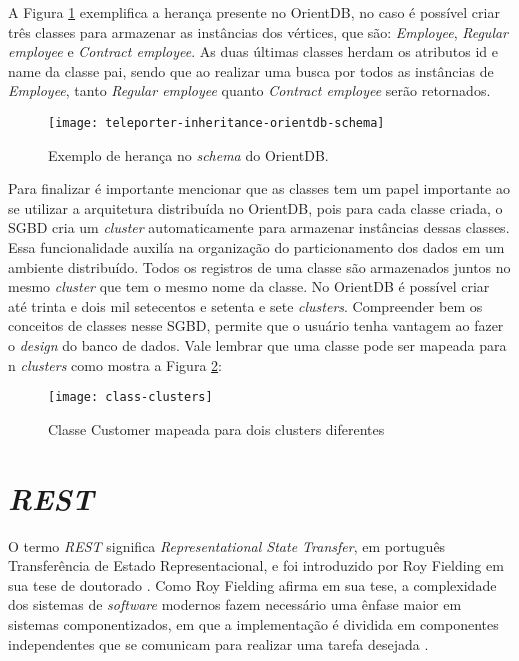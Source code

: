 	A Figura \ref{fig:inheritance-orient}  exemplifica a herança presente no OrientDB, no caso é possível criar três classes para armazenar as instâncias dos vértices, que são: \textit{Employee}, \textit{Regular employee} e \textit{Contract employee}. As duas últimas classes herdam os atributos id e name da classe pai, sendo que ao realizar uma busca por todos as instâncias de \textit{Employee}, tanto \textit{Regular employee} quanto \textit{Contract employee} serão retornados.
	
\begin{figure}[h]
	\centering
    \texttt{[image: teleporter-inheritance-orientdb-schema]}
    \caption{Exemplo de herança no \textit{schema} do OrientDB. }
    \label{fig:inheritance-orient}
\end{figure}
	
	Para finalizar é importante mencionar que as classes tem um papel importante ao se utilizar a arquitetura distribuída no OrientDB, pois para cada classe criada, o SGBD cria um \textit{cluster} automaticamente para armazenar instâncias dessas classes. Essa funcionalidade auxilía na organização do particionamento dos dados em um ambiente distribuído. Todos os registros de uma classe são armazenados juntos no mesmo \textit{cluster} que tem o mesmo nome da classe. No OrientDB é possível criar até trinta e dois mil setecentos e setenta e sete \textit{clusters}. Compreender bem os conceitos de classes nesse SGBD, permite que o usuário tenha vantagem ao fazer o \textit{design} do banco de dados. Vale lembrar que uma classe pode ser mapeada para n \textit{clusters} como mostra a Figura \ref{fig:class-cluster}:
\begin{figure}[h]
	\centering
    \texttt{[image: class-clusters]}
    \caption{Classe Customer mapeada para dois clusters diferentes}
    \label{fig:class-cluster}
\end{figure}

\section{\textit{REST}}

	O termo \textit{REST} significa \textit{Representational State Transfer}, em português Transferência de Estado Representacional, e foi introduzido por Roy Fielding em sua tese de doutorado \cite{fielding2000architectural}. Como Roy Fielding afirma em sua tese, a complexidade dos sistemas de \textit{software} modernos fazem necessário uma ênfase maior  em sistemas componentizados, em que a implementação é dividida em componentes independentes que se comunicam para realizar uma tarefa desejada \cite{fielding2000architectural}.
	
